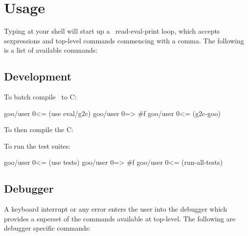 \documentclass[twoside,twocolumn,9pt]{extarticle}
\begin{document}
\section{Usage}

Typing  at your shell will start up a \goo\ read-eval-print
loop, which accepts sexpressions and top-level commands commencing
with a comma.  The following is a list of available commands:

\begin{defs}
\end{defs}

\subsection{Development}

To batch compile \goo\ to C:

\begin{exv}
goo/user 0<= (use eval/g2c)
goo/user 0=> #f
goo/user 0<= (g2c-goo)
\end{exv}

To then compile the C:


To run the test suites:

\begin{exv}
goo/user 0<= (use tests)
goo/user 0=> #f
goo/user 0<= (run-all-tests)
\end{exv}

\subsection{Debugger}

A keyboard interrupt or any error enters the user into the debugger
which provides a superset of the commands available at top-level.
The following are debugger specific commands:
\end{document}
